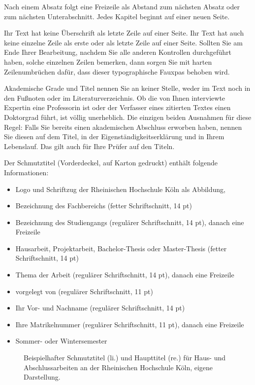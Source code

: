Nach einem Absatz folgt eine Freizeile als Abstand zum nächsten Absatz oder zum nächsten Unterabschnitt. Jedes Kapitel beginnt auf einer neuen Seite.

Ihr Text hat keine Überschrift als letzte Zeile auf einer Seite. Ihr Text hat auch keine einzelne Zeile als erste oder als letzte Zeile auf einer Seite. Sollten Sie am Ende Ihrer Bearbeitung, nachdem Sie alle anderen Kontrollen durchgeführt haben, solche einzelnen Zeilen bemerken, dann sorgen Sie mit harten Zeilenumbrüchen dafür, dass dieser typographische Fauxpas behoben wird.

Akademische Grade und Titel nennen Sie an keiner Stelle, weder im Text noch in den Fußnoten oder im Literaturverzeichnis. Ob die von Ihnen interviewte Expertin eine Professorin ist oder der Verfasser eines zitierten Textes einen Doktorgrad führt, ist völlig unerheblich. Die einzigen beiden Ausnahmen für diese Regel: Falls Sie bereits einen akademischen Abschluss erworben haben, nennen Sie diesen auf dem Titel, in der Eigenständigkeitserklärung und in Ihrem Lebenslauf. Das gilt auch für Ihre Prüfer auf den Titeln.

Der Schmutztitel (Vorderdeckel, auf Karton gedruckt) enthält folgende Informationen:
\begin{itemize}[label={--}]
\item Logo und Schriftzug der Rheinischen Hochschule Köln als Abbildung,
\item Bezeichnung des Fachbereichs (fetter Schriftschnitt, 14 pt)
\item Bezeichnung des Studiengangs (regulärer Schriftschnitt, 14 pt), danach eine Freizeile
\item Hausarbeit, Projektarbeit, Bachelor-Thesis oder Master-Thesis (fetter Schriftschnitt, 14 pt)
\item Thema der Arbeit (regulärer Schriftschnitt, 14 pt), danach eine Freizeile
\item vorgelegt von (regulärer Schriftschnitt, 11 pt)
\item Ihr Vor- und Nachname (regulärer Schriftschnitt, 14 pt)
\item Ihre Matrikelnummer (regulärer Schriftschnitt, 11 pt), danach eine Freizeile
\item Sommer- oder Wintersemester
\end{itemize}

\begin{figure}[h]
\centering
\caption[Beispielhafter Schmutztitel und Haupttitel für Haus- und Abschlussarbeiten an der Rheinischen Hochschule Köln,]{Beispielhafter Schmutztitel (li.) und Haupttitel (re.) für Haus- und Abschlussarbeiten an der Rheinischen Hochschule Köln, eigene Darstellung.}
\label{fig:schmutztitel-haupttitel}
\end{figure}

